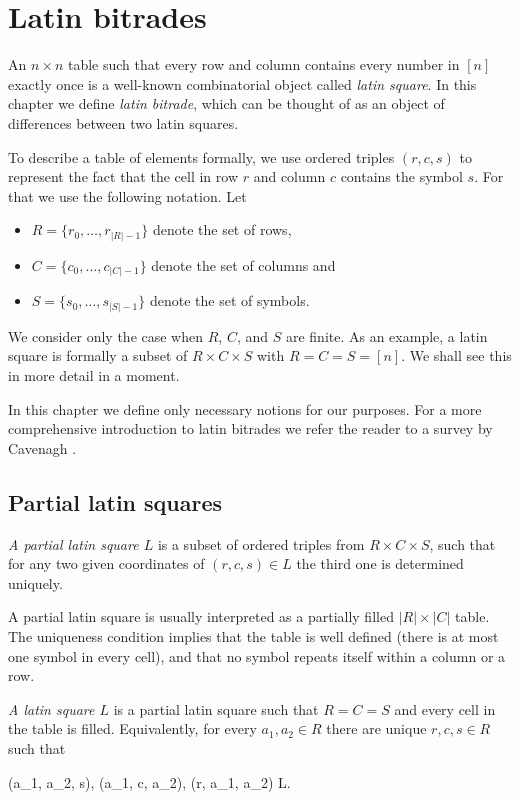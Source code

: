 \chapter{Latin bitrades}
\label{chap:bitrades}

An $n \times n$ table such that every row and column contains every number in $[n]$ exactly once is a well-known combinatorial object called \emph{latin square}. In this chapter we define \emph{latin bitrade}, which can be thought of as an object of differences between two latin squares.

To describe a table of elements formally, we use ordered triples $(r,c,s)$ to represent the fact that the cell in row $r$ and column $c$ contains the symbol $s$. For that we use the following notation. Let
\begin{itemize}
	\item $R = \{r_0,\dots,r_{|R|-1}\}$ denote the set of rows,
	\item $C = \{c_0,\dots,c_{|C|-1}\}$ denote the set of columns and
	\item $S = \{s_0,\dots,s_{|S|-1}\}$ denote the set of symbols.
\end{itemize}
We consider only the case when $R$, $C$, and $S$ are finite. As an example, a latin square is formally a subset of $R \times C \times S$ with $R = C = S = [n]$. We shall see this in more detail in a moment.

In this chapter we define only necessary notions for our purposes. For a more comprehensive introduction to latin bitrades we refer the reader to a survey by Cavenagh \cite{Cavenagh08}.

\section{Partial latin squares}

\begin{defn}
\emph{A partial latin square $L$} is a subset of ordered triples from $R \times C \times S$, such that for any two given coordinates of $(r,c,s)\in L$ the third one is determined uniquely.
\end{defn}

A partial latin square is usually interpreted as a partially filled $|R| \times |C|$ table. The uniqueness condition implies that the table is well defined (there is at most one symbol in every cell), and that no symbol repeats itself within a column or a row.

\begin{defn}
\emph{A latin square $L$} is a partial latin square such that $R=C=S$ and every cell in the table is filled. Equivalently, for every $a_1, a_2 \in R$ there are unique $r,c,s \in R$ such that
\begin{cosyeqnarray}
	(a_1, a_2, s), (a_1, c, a_2), (r, a_1, a_2) \in L.
\end{cosyeqnarray}
\end{defn}

